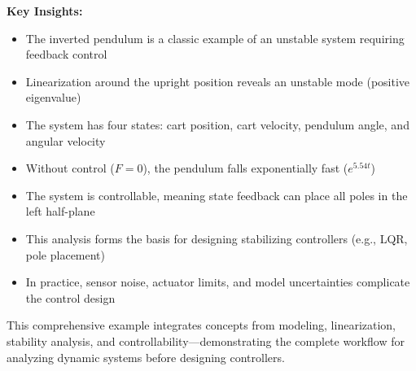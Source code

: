 \documentclass[11pt,a4paper]{article}
\begin{document}
\textbf{Key Insights:}
\begin{itemize}
\item The inverted pendulum is a classic example of an unstable system requiring feedback control
\item Linearization around the upright position reveals an unstable mode (positive eigenvalue)
\item The system has four states: cart position, cart velocity, pendulum angle, and angular velocity
\item Without control ($F = 0$), the pendulum falls exponentially fast ($e^{5.54t}$)
\item The system is controllable, meaning state feedback can place all poles in the left half-plane
\item This analysis forms the basis for designing stabilizing controllers (e.g., LQR, pole placement)
\item In practice, sensor noise, actuator limits, and model uncertainties complicate the control design
\end{itemize}

This comprehensive example integrates concepts from modeling, linearization, stability analysis, and controllability—demonstrating the complete workflow for analyzing dynamic systems before designing controllers.
\end{document}
